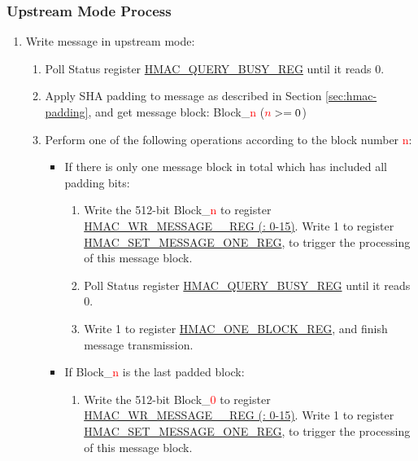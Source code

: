 \documentclass[main\_\_EN.tex]{subfiles}
\begin{document}
\subsubsection{Upstream Mode Process}
\label{sec:hmac-upstream-process}

\begin{enumerate}

    \item Write message in upstream mode:
    \begin{enumerate}
        \item Poll Status register \hyperref[regdesc:HMACQUERYBUSYREG]{HMAC\_QUERY\_BUSY\_REG} until it reads 0.
        \item Apply SHA padding to message as described in Section \ref{sec:hmac-padding}, and get message block: Block\_\textcolor{red}{n} ($\textcolor{red}{n}>=0$)
        \item Perform one of the following operations according to the block number \textcolor{red}{n}:
        \begin{itemize}
            \item If there is only one message block in total which has included all padding bits:
            \begin{enumerate}
                \item Write the 512-bit Block\_\textcolor{red}{n} to register \hyperref[regdesc:HMACWRMESSAGENREG]
                {HMAC\_WR\_MESSAGE\_\_REG (: 0-15)}. Write 1 to register \hyperref[regdesc:HMACSETMESSAGEONEREG]{HMAC\_SET\_MESSAGE\_ONE\_REG}, to trigger the processing of this message block.
                \item Poll Status register \hyperref[regdesc:HMACQUERYBUSYREG]{HMAC\_QUERY\_BUSY\_REG} until it reads 0.
                \item Write 1 to register \hyperref[regdesc:HMACONEBLOCKREG]{HMAC\_ONE\_BLOCK\_REG}, and finish message transmission.
            \end{enumerate}
            \item If Block\_\textcolor{red}{n} is the last padded block:
            \begin{enumerate}
                \item Write the 512-bit Block\_\textcolor{red}{0} to register \hyperref[regdesc:HMACWRMESSAGENREG]
                {HMAC\_WR\_MESSAGE\_\_REG (: 0-15)}. Write 1 to register \hyperref[regdesc:HMACSETMESSAGEONEREG]{HMAC\_SET\_MESSAGE\_ONE\_REG}, to trigger the processing of this message block.

\end{enumerate}
\end{itemize}
\end{enumerate}
\end{enumerate}
\end{document}
